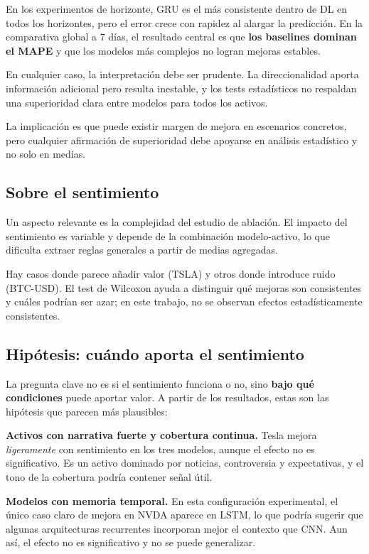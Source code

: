 En los experimentos de horizonte, GRU es el más consistente dentro de DL en todos los horizontes, pero el error crece con rapidez al alargar la predicción. En la comparativa global a 7 días, el resultado central es que \textbf{los baselines dominan el MAPE} y que los modelos más complejos no logran mejoras estables.

En cualquier caso, la interpretación debe ser prudente. La direccionalidad aporta información adicional pero resulta inestable, y los tests estadísticos no respaldan una superioridad clara entre modelos para todos los activos.

La implicación es que puede existir margen de mejora en escenarios concretos, pero cualquier afirmación de superioridad debe apoyarse en análisis estadístico y no solo en medias.

\subsection{Sobre el sentimiento}

Un aspecto relevante es la complejidad del estudio de ablación. El impacto del sentimiento es variable y depende de la combinación modelo-activo, lo que dificulta extraer reglas generales a partir de medias agregadas.

Hay casos donde parece añadir valor (TSLA) y otros donde introduce ruido (BTC-USD). El test de Wilcoxon ayuda a distinguir qué mejoras son consistentes y cuáles podrían ser azar; en este trabajo, no se observan efectos estadísticamente consistentes.

\subsection{Hipótesis: cuándo aporta el sentimiento}

La pregunta clave no es si el sentimiento funciona o no, sino \textbf{bajo qué condiciones} puede aportar valor. A partir de los resultados, estas son las hipótesis que parecen más plausibles:

\textbf{Activos con narrativa fuerte y cobertura continua.} Tesla mejora \emph{ligeramente} con sentimiento en los tres modelos, aunque el efecto no es significativo. Es un activo dominado por noticias, controversia y expectativas, y el tono de la cobertura podría contener señal útil.

\textbf{Modelos con memoria temporal.} En esta configuración experimental, el único caso claro de mejora en NVDA aparece en LSTM, lo que podría sugerir que algunas arquitecturas recurrentes incorporan mejor el contexto que CNN. Aun así, el efecto no es significativo y no se puede generalizar.

